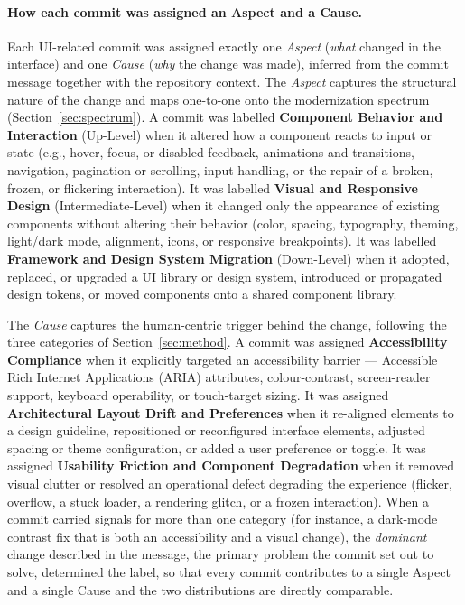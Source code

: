 \documentclass{article}
\begin{document}
\paragraph{How each commit was assigned an Aspect and a Cause.}
Each UI-related commit was assigned exactly one \emph{Aspect} (\emph{what}
changed in the interface) and one \emph{Cause} (\emph{why} the change was
made), inferred from the commit message together with the repository
context. The \emph{Aspect} captures the structural nature of the change and
maps one-to-one onto the modernization spectrum
(Section~\ref{sec:spectrum}). A commit was labelled \textbf{Component
Behavior and Interaction} (Up-Level) when it altered how a component reacts
to input or state (e.g., hover, focus, or disabled feedback, animations
and transitions, navigation, pagination or scrolling, input handling, or the
repair of a broken, frozen, or flickering interaction). It was labelled
\textbf{Visual and Responsive Design} (Intermediate-Level) when it changed
only the appearance of existing components without altering their behavior (color, spacing, typography, theming, light/dark mode, alignment, icons,
or responsive breakpoints). It was labelled \textbf{Framework and Design
System Migration} (Down-Level) when it adopted, replaced, or upgraded a UI
library or design system, introduced or propagated design tokens, or moved
components onto a shared component library.

The \emph{Cause} captures the human-centric trigger behind the change,
following the three categories of Section~\ref{sec:method}. A commit was
assigned \textbf{Accessibility Compliance} when it explicitly targeted an
accessibility barrier --- Accessible Rich Internet Applications (ARIA) attributes, colour-contrast, screen-reader
support, keyboard operability, or touch-target sizing. It was assigned
\textbf{Architectural Layout Drift and Preferences} when it re-aligned
elements to a design guideline, repositioned or reconfigured interface
elements, adjusted spacing or theme configuration, or added a user
preference or toggle. It was assigned \textbf{Usability Friction and
Component Degradation} when it removed visual clutter or resolved an
operational defect degrading the experience (flicker, overflow, a stuck
loader, a rendering glitch, or a frozen interaction). When a commit carried
signals for more than one category (for instance, a dark-mode contrast fix
that is both an accessibility and a visual change), the \emph{dominant}
change described in the message, the primary problem the commit set out
to solve, determined the label, so that every commit contributes to a
single Aspect and a single Cause and the two distributions are directly
comparable.
\end{document}
